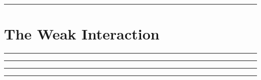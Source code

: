 
\noindent\rule{7in}{2.8pt}
\section{The Weak Interaction}
    
\begin{problem}{11.1}

\end{problem}
\begin{solution}

\end{solution}

\noindent\rule{7in}{1.5pt}


\begin{problem}{11.2}

\end{problem}
\begin{solution}

\end{solution}

\noindent\rule{7in}{1.5pt}


\begin{problem}{11.3}

\end{problem}
\begin{solution}

\end{solution}

\noindent\rule{7in}{1.5pt}


\begin{problem}{11.4}

\end{problem}
\begin{solution}

\end{solution}

\noindent\rule{7in}{1.5pt}


